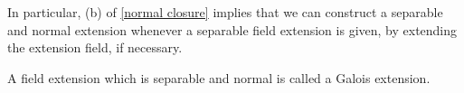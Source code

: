 In particular, (b) of \cref{normal closure} implies that we can construct a separable and normal extension whenever a separable field extension is given, by extending the extension field, if necessary.
\begin{defi}
    A field extension which is separable and normal is called a Galois extension.
\end{defi}